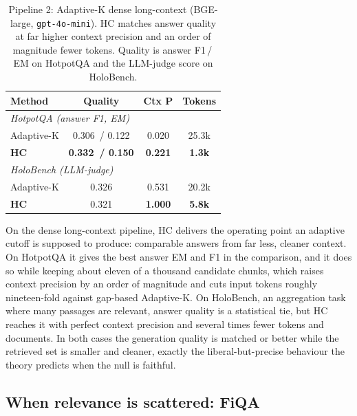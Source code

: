 \documentclass[letterpaper]{article}
\newcommand{\HotFHC}{0.332}\newcommand{\HotFAdaK}{0.306}
\newcommand{\HotEMHC}{0.150}\newcommand{\HotEMAdaK}{0.122}
\newcommand{\HotPrecHC}{0.221}\newcommand{\HotPrecAdaK}{0.020}
\newcommand{\HolJHC}{0.321}\newcommand{\HolJAdaK}{0.326}
\newcommand{\HolPrecHC}{1.000}\newcommand{\HolPrecAdaK}{0.531}
\begin{document}
\begin{table}[t]
\centering\small
\setlength{\extrarowheight}{1.5pt}
\begin{tabular}{|l|c|c|c|}
\hline
\textbf{Method} & \textbf{Quality} & \textbf{Ctx P} & \textbf{Tokens} \\
\hline
\multicolumn{4}{|l|}{\emph{HotpotQA (answer F1, EM)}}\\
\hline
Adaptive-K & \HotFAdaK\ / \HotEMAdaK & \HotPrecAdaK & 25.3k \\
\hline
\textbf{HC} & \textbf{\HotFHC\ / \HotEMHC} & \textbf{\HotPrecHC} & \textbf{1.3k} \\
\hline
\multicolumn{4}{|l|}{\emph{HoloBench (LLM-judge)}}\\
\hline
Adaptive-K & \HolJAdaK & \HolPrecAdaK & 20.2k \\
\hline
\textbf{HC} & \HolJHC & \textbf{\HolPrecHC} & \textbf{5.8k} \\
\hline
\end{tabular}
\caption{Pipeline 2: Adaptive-K dense long-context (BGE-large,
\texttt{gpt-4o-mini}). HC matches answer quality at far higher context
precision and an order of magnitude fewer tokens. Quality is answer
F1\,/\,EM on HotpotQA and the LLM-judge score on HoloBench.}
\label{tab:p1b}
\end{table}

On the dense long-context pipeline, HC delivers the operating point an
adaptive cutoff is supposed to produce: comparable answers from far less,
cleaner context. On HotpotQA it gives the best answer EM and F1 in the
comparison, and it does so while keeping about eleven of a thousand
candidate chunks, which raises context precision by an order of magnitude
and cuts input tokens roughly nineteen-fold against gap-based Adaptive-K.
On HoloBench, an aggregation task where many passages are relevant,
answer quality is a statistical tie, but HC reaches it with perfect
context precision and several times fewer tokens and documents. In both
cases the generation quality is matched or better while the retrieved set
is smaller and cleaner, exactly the liberal-but-precise behaviour the
theory predicts when the null is faithful.

\subsection{When relevance is scattered: FiQA}
\end{document}

